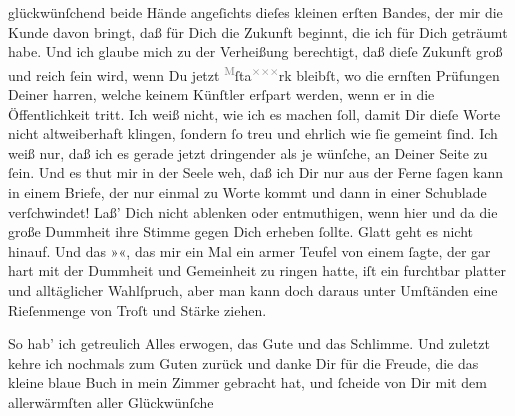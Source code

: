                glückwünſchend beide Hände angeſichts dieſes kleinen erſten Bandes, der mir die Kunde davon bringt, daß
               für Dich die Zukunft beginnt, die ich für Dich geträumt habe. Und ich glaube mich zu
               der Verheißung berechtigt, daß dieſe Zukunft groß und reich ſein wird, wenn Du jetzt
                  {\pb}\substVorne{}\textsuperscript{\textcolor{gray}{M}}\substDazwischen{}ſ\substHinten{}ta\substVorne{}\textsuperscript{\textcolor{gray}{×}\-\textcolor{gray}{×}\-\textcolor{gray}{×}}\substDazwischen{}rk\substHinten{} bleibſt, wo die ernſten Prüfungen Deiner harren, welche keinem Künſtler
               erſpart werden, wenn er in die Öffentlichkeit tritt. Ich weiß nicht, wie ich es
               machen ſoll, damit Dir dieſe Worte nicht altweiberhaft klingen, ſondern ſo treu und
               ehrlich wie ſie gemeint ſind. Ich weiß nur, daß ich es gerade jetzt dringender als je
               wünſche, \strikeout{\textcolor{gray}{and}} an Deiner Seite zu ſein. Und es thut mir in der Seele weh, daß ich Dir nur aus
               der Ferne ſagen kann in einem Briefe, der nur einmal zu Worte kommt und dann in einer
               Schublade verſchwindet! {\pb}Laß’ Dich nicht ablenken
               oder entmuthigen, wenn hier und da die große Dummheit ihre Stimme gegen Dich erheben
                  ſollte\strikeout{\textcolor{gray}{n}}. Glatt geht es nicht hinauf. Und das »\label{K_L02703-1v}\label{K_L02703-1}«, das mir ein Mal ein armer Teufel von einem \label{K_L02703-2v}\label{K_L02703-2} ſagte, der gar hart mit der
               Dummheit und Gemeinheit zu ringen hatte, iſt ein furchtbar platter und alltäglicher
               Wahlſpruch, aber man kann doch daraus unter Umſtänden eine Rieſenmenge von {\pb}Troſt und Stärke ziehen.\pend
           
\pstart
           So hab’ ich getreulich Alles erwogen, das Gute und das Schlimme. Und zuletzt kehre
               ich nochmals zum Guten zurück und danke Dir für die Freude, die das kleine blaue Buch in mein Zimmer gebracht
               hat, und ſcheide von Dir mit dem allerwärmſten aller Glückwünſche{\dotstwo}\pend
           
